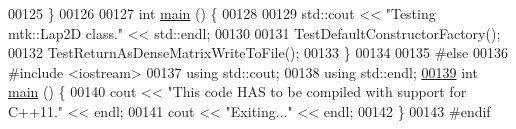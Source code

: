 \begin{DoxyCode}
00125 \}
00126 
00127 \textcolor{keywordtype}{int} \hyperlink{mtk__lap__2d__test_8cc_ae66f6b31b5ad750f1fe042a706a4e3d4}{main} () \{
00128 
00129   std::cout << \textcolor{stringliteral}{"Testing mtk::Lap2D class."} << std::endl;
00130 
00131   TestDefaultConstructorFactory();
00132   TestReturnAsDenseMatrixWriteToFile();
00133 \}
00134 
00135 \textcolor{preprocessor}{#else}
00136 \textcolor{preprocessor}{#include <iostream>}
00137 \textcolor{keyword}{using} std::cout;
00138 \textcolor{keyword}{using} std::endl;
\hypertarget{mtk__lap__2d__test_8cc_source_l00139}{}\hyperlink{mtk__lap__2d__test_8cc_ae66f6b31b5ad750f1fe042a706a4e3d4}{00139} \textcolor{keywordtype}{int} \hyperlink{mtk__lap__2d__test_8cc_ae66f6b31b5ad750f1fe042a706a4e3d4}{main} () \{
00140   cout << \textcolor{stringliteral}{"This code HAS to be compiled with support for C++11."} << endl;
00141   cout << \textcolor{stringliteral}{"Exiting..."} << endl;
00142 \}
00143 \textcolor{preprocessor}{#endif}
\end{DoxyCode}
